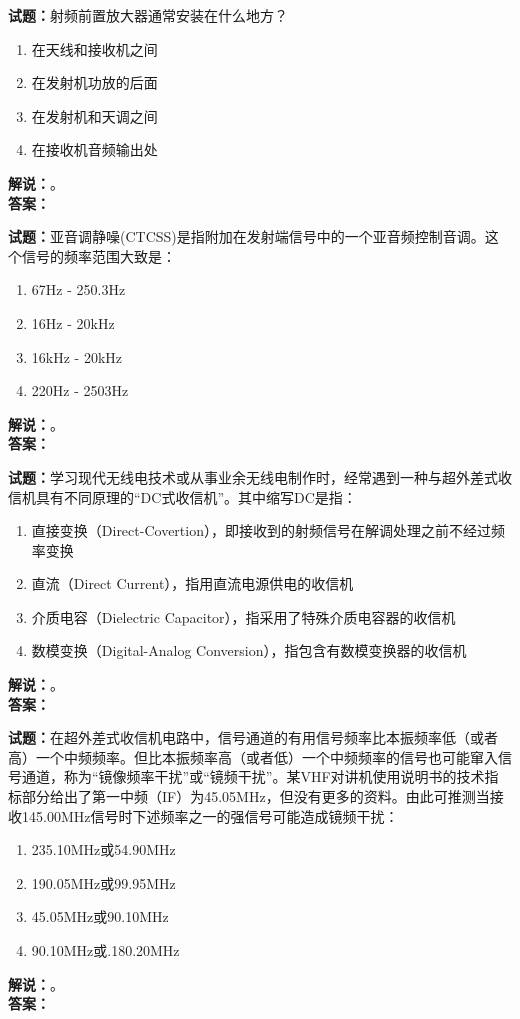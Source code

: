 \documentclass{ctexbook}
\begin{document}
\noindent\textbf{试题：}射频前置放大器通常安装在什么地方？
\begin{enumerate}[leftmargin=3em]
\item 在天线和接收机之间
\item 在发射机功放的后面
\item 在发射机和天调之间
\item 在接收机音频输出处
\end{enumerate}
\noindent\textbf{解说：}\textbf{}。\\\noindent\textbf{答案：}

\bigskip




\noindent\textbf{试题：}亚音调静噪(CTCSS)是指附加在发射端信号中的一个亚音频控制音调。这个信号的频率范围大致是：
\begin{enumerate}[leftmargin=3em]
\item 67Hz - 250.3Hz
\item 16Hz - 20\unit{\kHz}
\item 16\unit{\kHz} - 20\unit{\kHz}
\item 220Hz - 2503Hz
\end{enumerate}
\noindent\textbf{解说：}\textbf{}。\\\noindent\textbf{答案：}

\bigskip




\noindent\textbf{试题：}学习现代无线电技术或从事业余无线电制作时，经常遇到一种与超外差式收信机具有不同原理的“DC式收信机”。其中缩写DC是指：
\begin{enumerate}[leftmargin=3em]
\item 直接变换（Direct-Covertion），即接收到的射频信号在解调处理之前不经过频率变换
\item 直流（Direct Current），指用直流电源供电的收信机
\item 介质电容（Dielectric Capacitor），指采用了特殊介质电容器的收信机
\item 数模变换（Digital-Analog Conversion），指包含有数模变换器的收信机
\end{enumerate}
\noindent\textbf{解说：}\textbf{}。\\\noindent\textbf{答案：}

\bigskip




\noindent\textbf{试题：}在超外差式收信机电路中，信号通道的有用信号频率比本振频率低（或者高）一个中频频率。但比本振频率高（或者低）一个中频频率的信号也可能窜入信号通道，称为“镜像频率干扰”或“镜频干扰”。某VHF对讲机使用说明书的技术指标部分给出了第一中频（IF）为45.05\unit{\MHz}，但没有更多的资料。由此可推测当接收145.00\unit{\MHz}信号时下述频率之一的强信号可能造成镜频干扰：
\begin{enumerate}[leftmargin=3em]
\item 235.10\unit{\MHz}或54.90\unit{\MHz}
\item 190.05\unit{\MHz}或99.95\unit{\MHz}
\item 45.05\unit{\MHz}或90.10\unit{\MHz}
\item 90.10\unit{\MHz}或.180.20\unit{\MHz}
\end{enumerate}
\noindent\textbf{解说：}\textbf{}。\\\noindent\textbf{答案：}
\end{document}
